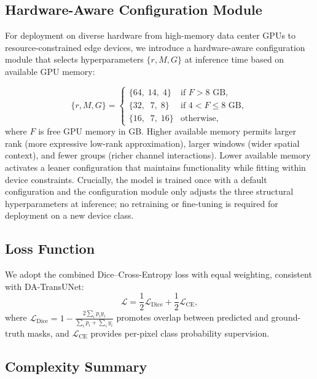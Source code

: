 \documentclass[conference]{IEEEtran}
\begin{document}
\subsection{Hardware-Aware Configuration Module}

For deployment on diverse hardware from high-memory data center GPUs to resource-constrained edge devices, we introduce a hardware-aware configuration module that selects hyperparameters $\{r, M, G\}$ at inference time based on available GPU memory:

\begin{equation}
  \{r, M, G\} =
  \begin{cases}
    \{64,\;14,\;4\} & \text{if } F > 8\text{ GB}, \\
    \{32,\;\;7,\;8\} & \text{if } 4 < F \leq 8\text{ GB}, \\
    \{16,\;\;7,\;16\} & \text{otherwise},
  \end{cases}
  \label{eq:hw_config}
\end{equation}
where $F$ is free GPU memory in GB. Higher available memory permits larger rank (more expressive low-rank approximation), larger windows (wider spatial context), and fewer groups (richer channel interactions). Lower available memory activates a leaner configuration that maintains functionality while fitting within device constraints. Crucially, the model is trained once with a default configuration and the configuration module only adjusts the three structural hyperparameters at inference; no retraining or fine-tuning is required for deployment on a new device class.

\subsection{Loss Function}

We adopt the combined Dice--Cross-Entropy loss with equal weighting, consistent with DA-TransUNet:
\begin{equation}
  \mathcal{L} = \frac{1}{2}\mathcal{L}_{\text{Dice}} + \frac{1}{2}\mathcal{L}_{\text{CE}},
  \label{eq:loss}
\end{equation}
where $\mathcal{L}_{\text{Dice}} = 1 - \frac{2 \sum_i p_i y_i}{\sum_i p_i + \sum_i y_i}$ promotes overlap between predicted and ground-truth masks, and $\mathcal{L}_{\text{CE}}$ provides per-pixel class probability supervision.

\subsection{Complexity Summary}
\end{document}

